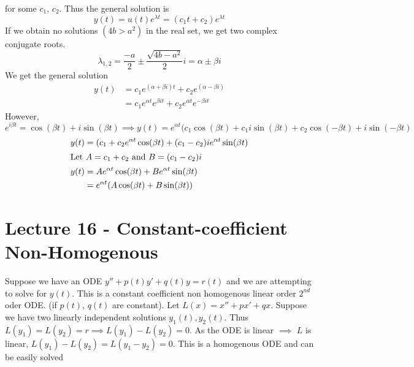 \documentclass{report}
\theoremstyle{definition}
\theoremstyle{plain}
\theoremstyle{remark}
\begin{document}
for some $ c_1 $, $ c_2 $. Thus the general solution is
$$ y(t) = u(t) e^{\lambda t} = (c_1 t + c_2) e^{\lambda t} $$
If we obtain no solutions $ (4b > a^2) $ in the real set, we get two complex
conjugate roots.
$$ \lambda_{1,2} = \frac{-a}{2} \pm \frac{\sqrt{4b - a^2}}{2}i = \alpha \pm
\beta i $$
We get the general solution
\begin{align*}
  y(t) &= c_1 e^{(\alpha + \beta i)t} + c_2 e^{(\alpha - \beta i)} \\
       &= c_1 e^{\alpha t} e^{\beta i t} + c_2 e^{\alpha t} e^{-\beta i t}
\end{align*}
However, $ e^{i\beta t} = \cos (\beta t) + i \sin (\beta t) \implies y(t)
= e^{\alpha t} (c_1 \cos(\beta t) + c_1 i \sin (\beta t) + c_2 \cos(-\beta t)
+ i \sin (-\beta t) $
\begin{align*}
  y(t) &= (c_1 + c_2 e^{\alpha t} \cos(\beta t) + (c_1 - c_2) ie^{\alpha t}
  \sin (\beta t)\\
  \intertext{Let $ A = c_1 + c_2 $ and $ B = (c_1 - c_2)i $ }
  y(t) &= Ae^{\alpha t} \cos (\beta t) + B e^{\alpha t} \sin (\beta t)\\
       &= e^{\alpha t} (A\cos (\beta t) + B \sin (\beta t))
\end{align*}
\section{Lecture 16 - Constant-coefficient Non-Homogenous}
Suppose we have an ODE $ y'' + p(t)y' + q(t)y = r(t) $ and we are attempting to
solve for $ y(t) $. This is a constant coefficient non homogenous linear order
$ 2^{nd} $ oder ODE. (if $ p(t) $, $ q(t) $ are constant). Let $ L(x) = x''
+ px' + qx $. Suppose we have two linearly independent solutions $ y_1(t),
y_2(t) $. Thus $ L(y_1) = L(y_2) = r \implies L(y_1) - L(y_2) = 0 $. As the ODE
is linear $ \implies $ $ L $ is linear, $ L(y_1) - L(y_2) = L(y_1 - y_2) = 0 $.
This is a homogenous ODE and can be easily solved
\end{document}
